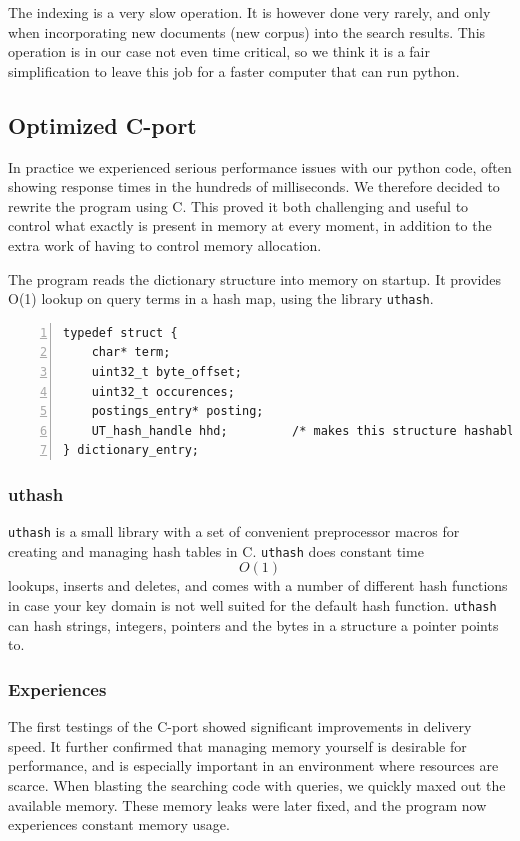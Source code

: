The indexing is a very slow operation. It is however done very rarely, and only when incorporating new documents (new corpus) into the search results. This operation is in our case not even time critical, so we think it is a fair simplification to leave this job for a faster computer that can run python.

\subsection{Optimized C-port}
In practice we experienced serious performance issues with our python code, often showing response times in the hundreds of milliseconds. We therefore decided to rewrite the program using C. This proved it both challenging and useful to control what exactly is present in memory at every moment, in addition to the extra work of having to control memory allocation.

The program reads the dictionary structure into memory on startup. It provides O(1) lookup on query terms in a hash map, using the library {\tt uthash}\cite{uthash}.

\begin{lstlisting}[style=customc,captionpos=b,caption={Structure of a dictionary entry (term)},numbers=left]
typedef struct {
    char* term;
    uint32_t byte_offset;
    uint32_t occurences;
    postings_entry* posting;
    UT_hash_handle hhd;         /* makes this structure hashable */
} dictionary_entry;
\end{lstlisting}
\subsubsection{uthash}
{\tt uthash} is a small library with a set of convenient preprocessor macros for creating and managing hash tables in C.
{\tt uthash} does constant time $$O(1)$$ lookups, inserts and deletes, and comes with a number of different hash functions in case your key domain is not well suited for the default hash function.
{\tt uthash} can hash strings, integers, pointers and the bytes in a structure a pointer points to.

\subsubsection{Experiences}
The first testings of the C-port showed significant improvements in delivery speed.
It further confirmed that managing memory yourself is desirable for performance, and is especially important in an environment where resources are scarce.
When blasting the searching code with queries, we quickly maxed out the available memory.
These memory leaks were later fixed, and the program now experiences constant memory usage.

